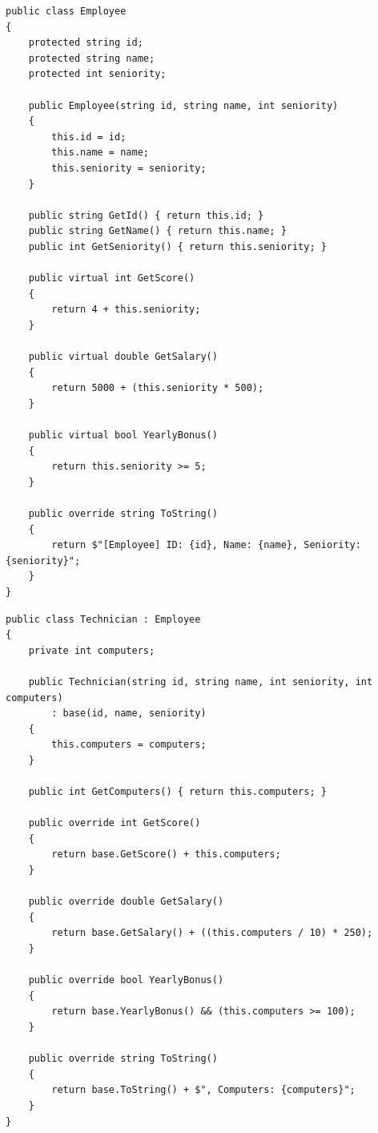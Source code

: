 \documentclass[14pt]{extarticle}
\begin{document}
\clearpage

\begin{boxSolution}
{\small
\begin{english}
\begin{verbatim}
public class Employee
{
    protected string id;
    protected string name;
    protected int seniority;

    public Employee(string id, string name, int seniority)
    {
        this.id = id;
        this.name = name;
        this.seniority = seniority;
    }

    public string GetId() { return this.id; }
    public string GetName() { return this.name; }
    public int GetSeniority() { return this.seniority; }

    public virtual int GetScore()
    {
        return 4 + this.seniority;
    }

    public virtual double GetSalary()
    {
        return 5000 + (this.seniority * 500);
    }

    public virtual bool YearlyBonus()
    {
        return this.seniority >= 5;
    }

    public override string ToString()
    {
        return $"[Employee] ID: {id}, Name: {name}, Seniority: {seniority}";
    }
}
\end{verbatim}
\end{english}
}
\end{boxSolution}

\clearpage

\begin{boxSolution}
{\small
\begin{english}
\begin{verbatim}
public class Technician : Employee
{
    private int computers;

    public Technician(string id, string name, int seniority, int computers)
        : base(id, name, seniority)
    {
        this.computers = computers;
    }

    public int GetComputers() { return this.computers; }

    public override int GetScore()
    {
        return base.GetScore() + this.computers;
    }

    public override double GetSalary()
    {
        return base.GetSalary() + ((this.computers / 10) * 250);
    }

    public override bool YearlyBonus()
    {
        return base.YearlyBonus() && (this.computers >= 100);
    }

    public override string ToString()
    {
        return base.ToString() + $", Computers: {computers}";
    }
}
\end{verbatim}
\end{english}
}
\end{boxSolution}
\end{document}
